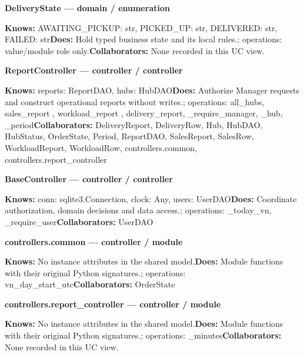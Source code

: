 \textbf{DeliveryState --- domain / \guillemotleft{}enumeration\guillemotright{}}

\textbf{Knows:} AWAITING\_PICKUP: str, PICKED\_UP: str, DELIVERED: str, FAILED: str\newline{}\textbf{Does:} Hold typed business state and its local rules.; operations: value/module role only.\newline{}\textbf{Collaborators:} None recorded in this UC view.

\textbf{ReportController --- controller / \guillemotleft{}controller\guillemotright{}}

\textbf{Knows:} reports: ReportDAO, hubs: HubDAO\newline{}\textbf{Does:} Authorize Manager requests and construct operational reports without writes.; operations: all\_hubs, sales\_report , workload\_report , delivery\_report, \_require\_manager, \_hub, \_period\newline{}\textbf{Collaborators:} DeliveryReport, DeliveryRow, Hub, HubDAO, HubStatus, OrderState, Period, ReportDAO, SalesReport, SalesRow, WorkloadReport, WorkloadRow, controllers.common, controllers.report\_controller

\textbf{BaseController --- controller / \guillemotleft{}controller\guillemotright{}}

\textbf{Knows:} conn: sqlite3.Connection, clock: Any, users: UserDAO\newline{}\textbf{Does:} Coordinate authorization, domain decisions and data access.; operations: \_today\_vn, \_require\_user\newline{}\textbf{Collaborators:} UserDAO

\textbf{controllers.common --- controller / \guillemotleft{}module\guillemotright{}}

\textbf{Knows:} No instance attributes in the shared model.\newline{}\textbf{Does:} Module functions with their original Python signatures.; operations: vn\_day\_start\_utc\newline{}\textbf{Collaborators:} OrderState

\textbf{controllers.report\_controller --- controller / \guillemotleft{}module\guillemotright{}}

\textbf{Knows:} No instance attributes in the shared model.\newline{}\textbf{Does:} Module functions with their original Python signatures.; operations: \_minutes\newline{}\textbf{Collaborators:} None recorded in this UC view.

